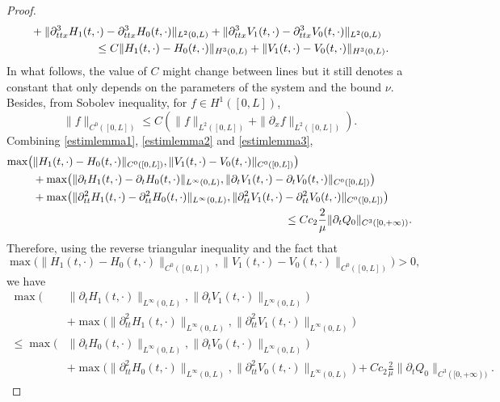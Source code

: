 \documentclass[JEP,XML,SOM,Unicode]{cedram}
\theoremstyle{definition}
\begin{document}
\begin{proof}
\begin{align}
&+\|\partial_{ttx}^{3}H_{1}(t,\cdot)-\partial_{ttx}^{3}H_{0}(t,\cdot)\|_{L^{2}(0,L)}+\|\partial_{ttx}^{3}V_{1}(t,\cdot)-\partial_{ttx}^{3}V_{0}(t,\cdot)\|_{L^{2}(0,L)}
\\\notag
&\hspace*{2cm}\leq C\|H_{1}(t,\cdot)-H_{0}(t,\cdot)\|_{H^{3}(0,L)}+\|V_{1}(t,\cdot)-V_{0}(t,\cdot)\|_{H^{3}(0,L)}.
\end{align}
In what follows, the value of $C$ might change between lines but it still denotes a constant that only depends on the parameters of the system and the bound $\nu$. Besides, from Sobolev inequality, for $f\in H^{1}([0,L])$,
\begin{equation}\label{estimlemma3}
\|f\|_{C^{0}([0,L])} \leq C\left(\|f\|_{L^{2}([0,L])}+\|\partial_{x}f\|_{L^{2}([0,L])}\right).
\end{equation}
Combining \eqref{estimlemma1}, \eqref{estimlemma2} and \eqref{estimlemma3},
\begin{align*}
\max\bigl(&\|H_{1}(t,\cdot)-H_{0}(t,\cdot)\|_{C^{0}([0,L])},\|V_{1}(t,\cdot)-V_{0}(t,\cdot)\|_{C^{0}([0,L])}\bigr)\\
&+\max\bigl(\|\partial_{t}H_{1}(t,\cdot)-\partial_{t}H_{0}(t,\cdot)\|_{L^{\infty}(0,L)},\|\partial_{t}V_{1}(t,\cdot)-\partial_{t}V_{0}(t,\cdot)\|_{C^{0}([0,L])}\bigr)\\
&+
\max\bigl(\|\partial_{tt}^{2}H_{1}(t,\cdot)-\partial_{tt}^{2}H_{0}(t,\cdot)\|_{L^{\infty}(0,L)},\|\partial_{tt}^{{2}}V_{1}(t,\cdot)-\partial_{tt}^{{2}}V_{0}(t,\cdot)\|_{C^{0}([0,L])}\bigr)\\
&\hspace*{8cm}\leq Cc_{2} \frac{2}{\mu} \|\partial_{t}Q_{0}\|_{C^{3}([0,+\infty))}.
\end{align*}
Therefore, using the {reverse} triangular inequality and the fact that
\[
\max \bigl(\|H_{1}(t,\cdot)-H_{0}(t,\cdot)\|_{C^{0}([0,L])},\|V_{1}(t,\cdot)-V_{0}(t,\cdot)\|_{C^{0}([0,L])} \bigr)>0,
\]
we have
\begin{equation*}
\begin{split}
\max\bigl(&\|\partial_{t}H_{1}(t,\cdot)\|_{L^{\infty}(0,L)},\|\partial_{t}V_{1}(t,\cdot)\|_{L^{\infty}(0,L)}\bigr)\\&+
\max\bigl(\|\partial_{tt}^{2}H_{1}(t,\cdot)\|_{L^{\infty}(0,L)},\|\partial_{tt}^{{2}}V_{1}(t,\cdot)\|_{L^{\infty}(0,L)}\bigr)\\
\leq \max\bigl(&\|\partial_{t}H_{0}(t,\cdot)\|_{L^{\infty}(0,L)},\|\partial_{t}V_{0}(t,\cdot)\|_{L^{\infty}(0,L)}\bigr)\\
&+
\max\bigl(\|\partial_{tt}^{2}H_{0}(t,\cdot)\|_{L^{\infty}(0,L)},\|\partial_{tt}^{{2}}V_{0}(t,\cdot)\|_{L^{\infty}(0,L)}\bigr)+ Cc_{2} \frac{2}{\mu} \|\partial_{t}Q_{0}\|_{C^{3}([0,+\infty))}.

\end{split}
\end{equation*}
\end{proof}
\end{document}
